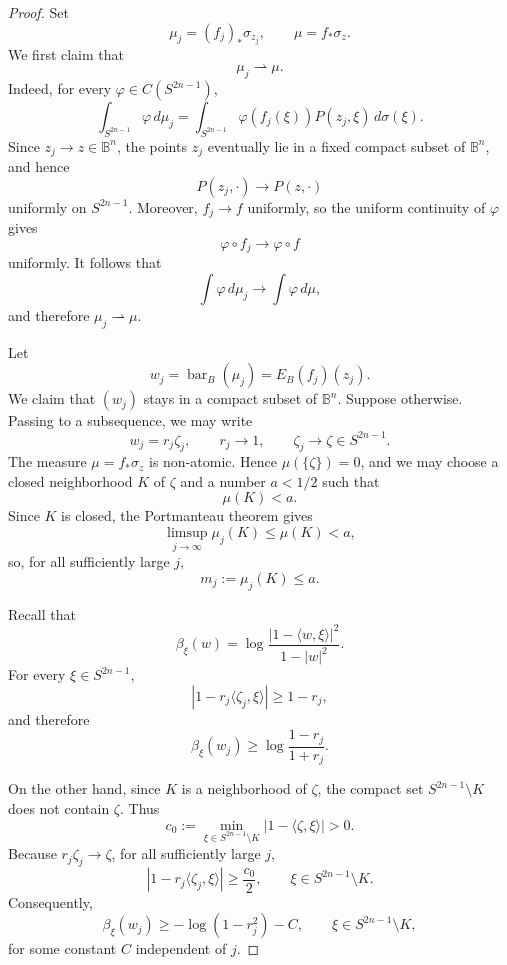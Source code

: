 \documentclass[11pt]{article}
\theoremstyle{definition}
\theoremstyle{remark}
\theoremstyle{definition}
\newcommand{\B}{\mathbb B}
\newcommand{\barB}{\operatorname{bar}_{B}}
\begin{document}
\begin{proof}
Set
\[
        \mu_j=(f_j)_*\sigma_{z_j},
        \qquad
        \mu=f_*\sigma_z.
\]
We first claim that
\[
        \mu_j\rightharpoonup\mu.
\]
Indeed, for every \(\varphi\in C(S^{2n-1})\),
\[
\int_{S^{2n-1}}\varphi\,d\mu_j
=
\int_{S^{2n-1}}
\varphi(f_j(\xi))P(z_j,\xi)\,d\sigma(\xi).
\]
Since \(z_j\to z\in\B^n\), the points \(z_j\) eventually lie in a fixed
compact subset of \(\B^n\), and hence
\[
        P(z_j,\cdot)\longrightarrow P(z,\cdot)
\]
uniformly on \(S^{2n-1}\). Moreover, \(f_j\to f\) uniformly, so the uniform
continuity of \(\varphi\) gives
\[
        \varphi\circ f_j\longrightarrow\varphi\circ f
\]
uniformly. It follows that
\[
        \int\varphi\,d\mu_j\longrightarrow\int\varphi\,d\mu,
\]
and therefore \(\mu_j\rightharpoonup\mu\).

Let
\[
        w_j=\barB(\mu_j)=E_B(f_j)(z_j).
\]
We claim that \((w_j)\) stays in a compact subset of \(\B^n\). Suppose
otherwise. Passing to a subsequence, we may write
\[
        w_j=r_j\zeta_j,
        \qquad
        r_j\to1,
        \qquad
        \zeta_j\to\zeta\in S^{2n-1}.
\]
The measure \(\mu=f_*\sigma_z\) is non-atomic. Hence
\(\mu(\{\zeta\})=0\), and we may choose a closed neighborhood \(K\) of
\(\zeta\) and a number \(a<1/2\) such that
\[
        \mu(K)<a.
\]
Since \(K\) is closed, the Portmanteau theorem gives
\[
        \limsup_{j\to\infty}\mu_j(K)\le \mu(K)<a,
\]
so, for all sufficiently large \(j\),
\[
        m_j:=\mu_j(K)\le a.
\]

Recall that
\[
        \beta_\xi(w)
        =
        \log\frac{|1-\langle w,\xi\rangle|^2}{1-|w|^2}.
\]
For every \(\xi\in S^{2n-1}\),
\[
        |1-r_j\langle\zeta_j,\xi\rangle|
        \ge 1-r_j,
\]
and therefore
\begin{equation}\label{eq:busemann-global-lower}
        \beta_\xi(w_j)
        \ge
        \log\frac{1-r_j}{1+r_j}.
\end{equation}

On the other hand, since \(K\) is a neighborhood of \(\zeta\), the compact
set \(S^{2n-1}\setminus K\) does not contain \(\zeta\). Thus
\[
        c_0:=
        \min_{\xi\in S^{2n-1}\setminus K}
        |1-\langle\zeta,\xi\rangle|>0.
\]
Because \(r_j\zeta_j\to\zeta\), for all sufficiently large \(j\),
\[
        |1-r_j\langle\zeta_j,\xi\rangle|
        \ge \frac{c_0}{2},
        \qquad
        \xi\in S^{2n-1}\setminus K.
\]
Consequently,
\begin{equation}\label{eq:busemann-away-lower}
        \beta_\xi(w_j)
        \ge
        -\log(1-r_j^2)-C,
        \qquad
        \xi\in S^{2n-1}\setminus K,
\end{equation}
for some constant \(C\) independent of \(j\).


\end{proof}
\end{document}
